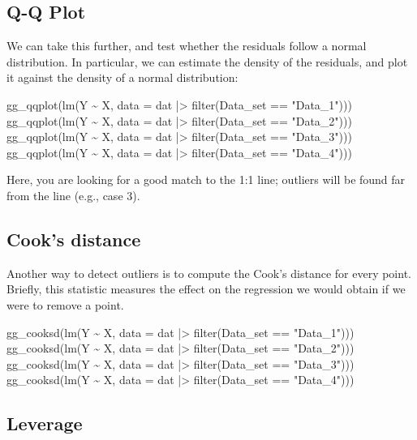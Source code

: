 \documentclass[
  letterpaper,
  DIV=11,
  numbers=noendperiod]{scrreprt}
\newenvironment{Shaded}{\begin{snugshade}}{\end{snugshade}}
\newcommand{\NormalTok}[1]{\textcolor[rgb]{0.00,0.23,0.31}{#1}}
\begin{document}
\subsection{Q-Q Plot}\label{q-q-plot}

We can take this further, and test whether the residuals follow a normal
distribution. In particular, we can estimate the density of the
residuals, and plot it against the density of a normal distribution:

\begin{Shaded}
\begin{Highlighting}[]
\NormalTok{gg\_qqplot(lm(Y \textasciitilde{} X, data = dat |\textgreater{} filter(Data\_set == "Data\_1")))}
\NormalTok{gg\_qqplot(lm(Y \textasciitilde{} X, data = dat |\textgreater{} filter(Data\_set == "Data\_2")))}
\NormalTok{gg\_qqplot(lm(Y \textasciitilde{} X, data = dat |\textgreater{} filter(Data\_set == "Data\_3")))}
\NormalTok{gg\_qqplot(lm(Y \textasciitilde{} X, data = dat |\textgreater{} filter(Data\_set == "Data\_4")))}
\end{Highlighting}
\end{Shaded}

Here, you are looking for a good match to the 1:1 line; outliers will be
found far from the line (e.g., case 3).

\subsection{Cook's distance}\label{cooks-distance}

Another way to detect outliers is to compute the Cook's distance for
every point. Briefly, this statistic measures the effect on the
regression we would obtain if we were to remove a point.

\begin{Shaded}
\begin{Highlighting}[]
\NormalTok{gg\_cooksd(lm(Y \textasciitilde{} X, data = dat |\textgreater{} filter(Data\_set == "Data\_1")))}
\NormalTok{gg\_cooksd(lm(Y \textasciitilde{} X, data = dat |\textgreater{} filter(Data\_set == "Data\_2")))}
\NormalTok{gg\_cooksd(lm(Y \textasciitilde{} X, data = dat |\textgreater{} filter(Data\_set == "Data\_3")))}
\NormalTok{gg\_cooksd(lm(Y \textasciitilde{} X, data = dat |\textgreater{} filter(Data\_set == "Data\_4")))}
\end{Highlighting}
\end{Shaded}

\subsection{Leverage}\label{leverage}
\end{document}

